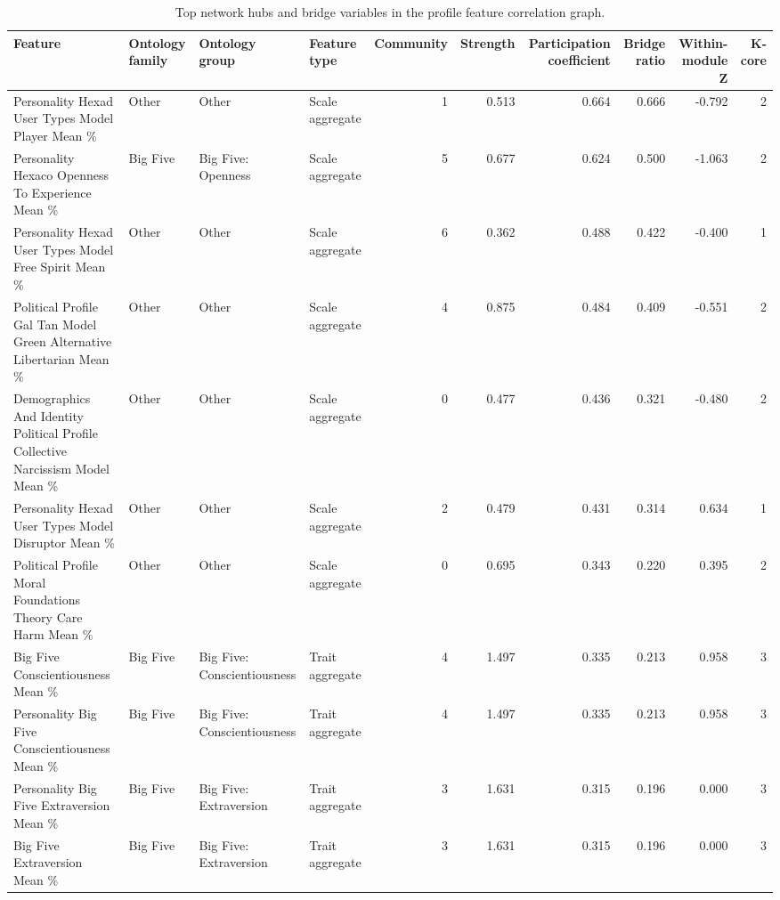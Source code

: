 \begin{table}[htbp]
\centering
\begin{threeparttable}
\caption{Top network hubs and bridge variables in the profile feature correlation graph.}
\label{tab:networksummary}
\small
\setlength{\tabcolsep}{4.5pt}
\renewcommand{\arraystretch}{1.10}
\begin{adjustbox}{max width=\linewidth}
\begin{tabular}{llllrrrrrr}
\toprule
Feature & Ontology family & Ontology group & Feature type & Community & Strength & Participation coefficient & Bridge ratio & Within-module Z & K-core \\
\midrule
Personality Hexad User Types Model Player Mean \% & Other & Other & Scale aggregate & 1 & 0.513 & 0.664 & 0.666 & -0.792 & 2 \\
Personality Hexaco Openness To Experience Mean \% & Big Five & Big Five: Openness & Scale aggregate & 5 & 0.677 & 0.624 & 0.500 & -1.063 & 2 \\
Personality Hexad User Types Model Free Spirit Mean \% & Other & Other & Scale aggregate & 6 & 0.362 & 0.488 & 0.422 & -0.400 & 1 \\
Political Profile Gal Tan Model Green Alternative Libertarian Mean \% & Other & Other & Scale aggregate & 4 & 0.875 & 0.484 & 0.409 & -0.551 & 2 \\
Demographics And Identity Political Profile Collective Narcissism Model Mean \% & Other & Other & Scale aggregate & 0 & 0.477 & 0.436 & 0.321 & -0.480 & 2 \\
Personality Hexad User Types Model Disruptor Mean \% & Other & Other & Scale aggregate & 2 & 0.479 & 0.431 & 0.314 & 0.634 & 1 \\
Political Profile Moral Foundations Theory Care Harm Mean \% & Other & Other & Scale aggregate & 0 & 0.695 & 0.343 & 0.220 & 0.395 & 2 \\
Big Five Conscientiousness Mean \% & Big Five & Big Five: Conscientiousness & Trait aggregate & 4 & 1.497 & 0.335 & 0.213 & 0.958 & 3 \\
Personality Big Five Conscientiousness Mean \% & Big Five & Big Five: Conscientiousness & Trait aggregate & 4 & 1.497 & 0.335 & 0.213 & 0.958 & 3 \\
Personality Big Five Extraversion Mean \% & Big Five & Big Five: Extraversion & Trait aggregate & 3 & 1.631 & 0.315 & 0.196 & 0.000 & 3 \\
Big Five Extraversion Mean \% & Big Five & Big Five: Extraversion & Trait aggregate & 3 & 1.631 & 0.315 & 0.196 & 0.000 & 3 \\

\end{tabular}
\end{adjustbox}
\end{threeparttable}
\end{table}
